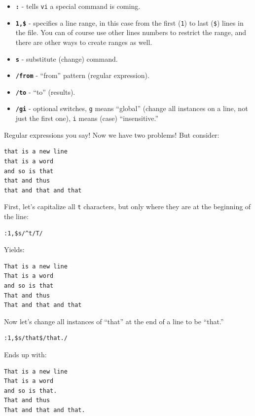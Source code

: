 \documentclass[10pt,]{book}
\numberwithin{figure}{chapter}
\begin{document}
\begin{itemize}
\item
  \textbf{\texttt{:}} - tells \texttt{vi} a special command is coming.
\item
  \textbf{\texttt{1,\$}} - specifies a line range, in this case from the
  first (\texttt{1}) to last (\texttt{\$}) lines in the file. You can of
  course use other lines numbers to restrict the range, and there are
  other ways to create ranges as well.
\item
  \textbf{\texttt{s}} - substitute (change) command.
\item
  \textbf{\texttt{/from}} - ``from'' pattern (regular expression).
\item
  \textbf{\texttt{/to}} - ``to'' (results).
\item
  \textbf{\texttt{/gi}} - optional switches, \texttt{g} means ``global''
  (change all instances on a line, not just the first one), \texttt{i}
  means (case) ``insensitive.''
\end{itemize}

Regular expressions you say! Now we have two problems! But consider:

\begin{verbatim}
that is a new line
that is a word
and so is that
that and thus
that and that and that
\end{verbatim}

First, let's capitalize all \texttt{t} characters, but only where they
are at the beginning of the line:

\begin{verbatim}
:1,$s/^t/T/
\end{verbatim}

Yields:

\begin{verbatim}
That is a new line
That is a word
and so is that
That and thus
That and that and that
\end{verbatim}

Now let's change all instances of ``that'' at the end of a line to be
``that.''

\begin{verbatim}
:1,$s/that$/that./
\end{verbatim}

Ends up with:

\begin{verbatim}
That is a new line
That is a word
and so is that.
That and thus
That and that and that.
\end{verbatim}
\end{document}

